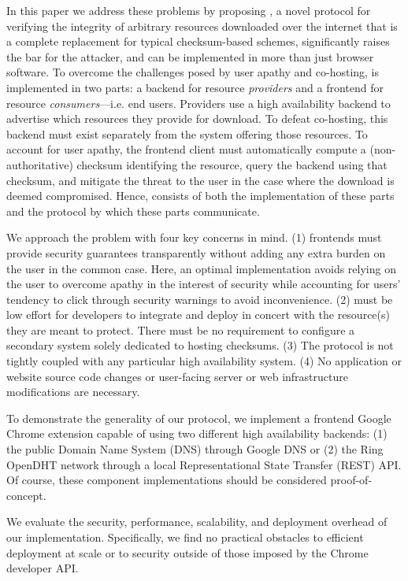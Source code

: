 In this paper we address these problems by proposing \SYSTEM{}, a novel protocol
for verifying the integrity of arbitrary resources downloaded over the internet
that is a complete replacement for typical checksum-based schemes, significantly
raises the bar for the attacker, and can be implemented in more than just
browser software. To overcome the challenges posed by user apathy and
co-hosting, \SYSTEM{} is implemented in two parts: a backend for resource
\emph{providers} and a frontend for resource \emph{consumers}---i.e. end users.
Providers use a high availability backend to advertise which resources they
provide for download. To defeat co-hosting, this backend must exist separately
from the system offering those resources. To account for user apathy, the
frontend client must automatically compute a (non-authoritative) checksum
identifying the resource, query the backend using that checksum, and mitigate
the threat to the user in the case where the download is deemed compromised.
Hence, \SYSTEM{} consists of both the implementation of these parts and the
protocol by which these parts communicate.

We approach the problem with four key concerns in mind. (1) \SYSTEM{} frontends
must provide security guarantees transparently without adding any extra burden
on the user in the common case. Here, an optimal implementation avoids relying
on the user to overcome apathy in the interest of security while accounting for
users' tendency to click through security warnings to avoid inconvenience. (2)
\SYSTEM{} must be low effort for developers to integrate and deploy in concert
with the resource(s) they are meant to protect. There must be no requirement to
configure a secondary system solely dedicated to hosting checksums. (3) The
protocol is not tightly coupled with any particular high availability system.
(4) No application or website source code changes or user-facing server or web
infrastructure modifications are necessary.

To demonstrate the generality of our protocol, we implement a frontend Google
Chrome extension capable of using two different high availability backends: (1)
the public Domain Name System (DNS) through Google DNS or (2) the Ring OpenDHT
network through a local Representational State Transfer (REST) API. Of course,
these \SYSTEM{} component implementations should be considered proof-of-concept.

We evaluate the security, performance, scalability, and deployment overhead
of our implementation. Specifically, we find no practical obstacles to efficient
deployment at scale or to security outside of those imposed by the Chrome
developer API.

